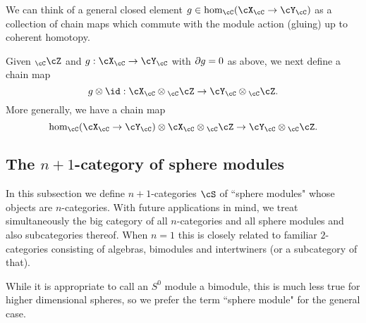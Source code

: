 We can think of a general closed element $g\in \hom_\cC(\cX_\cC \to \cY_\cC)$
as a collection of chain maps which commute with the module action (gluing) up to coherent homotopy.
\medskip

Given $_\cC\cZ$ and  $g: \cX_\cC \to \cY_\cC$ with $\partial g = 0$ as above, we next define a chain map
\[
	g\ot\id : \cX_\cC \ot {}_\cC\cZ \to \cY_\cC \ot {}_\cC\cZ .
\]
More generally, we have a chain map
\[
	\hom_\cC(\cX_\cC \to \cY_\cC) \ot \cX_\cC \ot {}_\cC\cZ \to \cY_\cC \ot {}_\cC\cZ .
\]





\medskip






\subsection{The $n{+}1$-category of sphere modules}
\label{ssec:spherecat}

In this subsection we define $n{+}1$-categories $\cS$ of ``sphere modules" 
whose objects are $n$-categories.
With future applications in mind, we treat simultaneously the big category
of all $n$-categories and all sphere modules and also subcategories thereof.
When $n=1$ this is closely related to familiar $2$-categories consisting of 
algebras, bimodules and intertwiners (or a subcategory of that).

While it is appropriate to call an $S^0$ module a bimodule,
this is much less true for higher dimensional spheres, 
so we prefer the term ``sphere module" for the general case.



